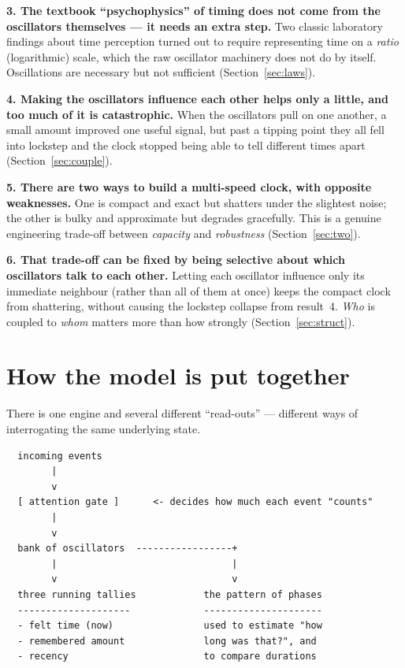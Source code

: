 \documentclass[11pt]{article}
\begin{document}
\textbf{3. The textbook ``psychophysics'' of timing does not come from the
oscillators themselves --- it needs an extra step.} Two classic laboratory findings
about time perception turned out to require representing time on a \emph{ratio}
(logarithmic) scale, which the raw oscillator machinery does not do by itself.
Oscillations are necessary but not sufficient (Section~\ref{sec:laws}).

\textbf{4. Making the oscillators influence each other helps only a little, and too
much of it is catastrophic.} When the oscillators pull on one another, a small amount
improved one useful signal, but past a tipping point they all fell into lockstep and
the clock stopped being able to tell different times apart (Section~\ref{sec:couple}).

\textbf{5. There are two ways to build a multi-speed clock, with opposite
weaknesses.} One is compact and exact but shatters under the slightest noise; the
other is bulky and approximate but degrades gracefully. This is a genuine engineering
trade-off between \emph{capacity} and \emph{robustness} (Section~\ref{sec:two}).

\textbf{6. That trade-off can be fixed by being selective about which oscillators talk
to each other.} Letting each oscillator influence only its immediate neighbour (rather
than all of them at once) keeps the compact clock from shattering, without causing the
lockstep collapse from result~4. \emph{Who} is coupled to \emph{whom} matters more
than how strongly (Section~\ref{sec:struct}).

\section{How the model is put together}

There is one engine and several different ``read-outs'' --- different ways of
interrogating the same underlying state.

\begin{verbatim}
  incoming events
        |
        v
  [ attention gate ]      <- decides how much each event "counts"
        |
        v
  bank of oscillators  -----------------+
        |                               |
        v                               v
  three running tallies            the pattern of phases
  --------------------             ---------------------
  - felt time (now)                used to estimate "how
  - remembered amount              long was that?", and
  - recency                        to compare durations
\end{verbatim}
\end{document}
